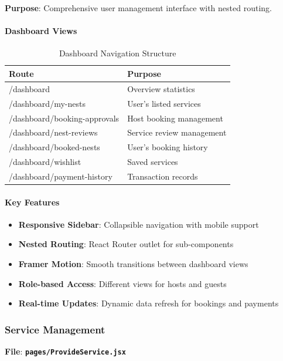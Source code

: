 \documentclass[12pt,a4paper]{article}
\newcommand{\file}[1]{\textbf{\texttt{#1}}}
\begin{document}
\textbf{Purpose}: Comprehensive user management interface with nested routing.

\paragraph{Dashboard Views}
\begin{table}[H]
\centering
\small
\begin{tabular}{@{}ll@{}}
\toprule
\textbf{Route} & \textbf{Purpose} \\
\midrule
/dashboard & Overview statistics \\
/dashboard/my-nests & User's listed services \\
/dashboard/booking-approvals & Host booking management \\
/dashboard/nest-reviews & Service review management \\
/dashboard/booked-nests & User's booking history \\
/dashboard/wishlist & Saved services \\
/dashboard/payment-history & Transaction records \\
\bottomrule
\end{tabular}
\caption{Dashboard Navigation Structure}
\label{tab:dashboard-routes}
\end{table}

\paragraph{Key Features}
\begin{itemize}
\item \textbf{Responsive Sidebar}: Collapsible navigation with mobile support
\item \textbf{Nested Routing}: React Router outlet for sub-components
\item \textbf{Framer Motion}: Smooth transitions between dashboard views
\item \textbf{Role-based Access}: Different views for hosts and guests
\item \textbf{Real-time Updates}: Dynamic data refresh for bookings and payments
\end{itemize}

\subsubsection{Service Management}
\label{subsubsec:service-management}

\textbf{File}: \file{pages/ProvideService.jsx}
\end{document}
